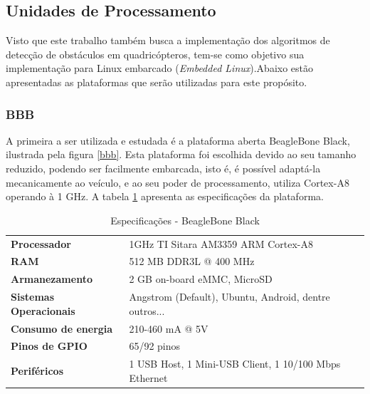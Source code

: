 \subsection{Unidades de Processamento}

Visto que este trabalho também busca a implementação dos algoritmos de detecção de obstáculos em quadricópteros, tem-se como objetivo sua implementação para Linux embarcado (\textit{Embedded Linux}).Abaixo estão apresentadas as plataformas que serão utilizadas para este propósito.


\subsubsection{BBB}

A primeira a ser utilizada e estudada é a plataforma aberta BeagleBone Black, ilustrada pela figura \ref{bbb}. Esta plataforma foi escolhida devido ao seu tamanho reduzido, podendo ser facilmente embarcada, isto é, é possível adaptá-la mecanicamente ao veículo, e ao seu poder de processamento, utiliza Cortex-A8 operando à 1 GHz. A tabela \ref{bbb_tab} apresenta as especificações da plataforma.

\begin{table}[]
\centering
\caption{Especificações - BeagleBone Black}
\label{bbb_tab}
\begin{tabular}{ll}
\textbf{Processador}           & 1GHz TI Sitara AM3359 ARM Cortex-A8			\\
\textbf{RAM}                   & 512 MB DDR3L @ 400 MHz					\\
\textbf{Armanezamento}         & 2 GB on-board eMMC, MicroSD				\\
\textbf{Sistemas Operacionais} & Angstrom (Default), Ubuntu, Android, dentre outros...	\\
\textbf{Consumo de energia}    & 210-460 mA @ 5V					\\
\textbf{Pinos de GPIO}         & 65/92 pinos						\\
\textbf{Periféricos}           & 1 USB Host, 1 Mini-USB Client, 1 10/100 Mbps Ethernet                                 
\end{tabular}
\end{table}

